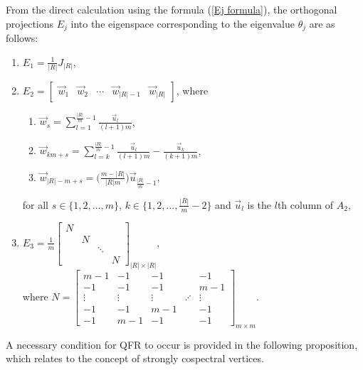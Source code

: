 \documentclass[12pt]{amsart}
\numberwithin{equation}{section}
\theoremstyle{definition}
\theoremstyle{definition} \numberwithin{equation}{section}
\begin{document}
From the direct calculation using the formula (\ref{Ej formula}), the orthogonal projections $E_j$ into the eigenspace corresponding to the eigenvalue $\theta_j$ are as follows: 
\begin{enumerate}
     \item $E_1 = \frac{1}{|R|}J_{|R|}$,
     
        \item $E_2 = \begin{bmatrix}
            \Vec{w}_1 & \Vec{w}_2&\cdots &\Vec{w}_{|R|-1} &\Vec{w}_{|R
            |}
        \end{bmatrix}$, where
            \begin{enumerate} 
            [label=(\roman*)]
                \item $\Vec{w}_s=\sum_{l=1}^{\frac{|R|}{m}-1}\frac{\Vec{u}_l}{(l+1)m}$,
                \item 
    $\Vec{w}_{km+s}=\sum_{l=k}^{\frac{|R|}{m}-1}\frac{\Vec{u}_l}{(l+1)m}-\frac{\Vec{u}_k}{(k+1)m}$, 
                \item 
                $\Vec{w}_{|R|-m+s} = \bigg( \frac{m-|R|}{|R|m} \bigg)\Vec{u}_{\frac{|R|}{m}-1}$, 
            \end{enumerate}
        
        for all $s \in \{1,2,\ldots,m\}$, $k \in \{1,2, \ldots , \frac{|R|}{m}-2\}$ and $\Vec{u}_l$ is the $l$th column of $A_2$,
        \item $E_3=\frac{1}{m} \begin{bmatrix}
            N & & &\\
              & N& &\\
              & &\ddots&\\
              & & &N 
        \end{bmatrix}_{|R| \times |R|}$, \\
        where $N = \begin{bmatrix}
            m-1&-1&-1&&-1\\
            -1&-1&-1&&m-1\\
    \vdots&\vdots&\vdots& \iddots &\vdots\\
             -1&-1&m-1&&-1\\
            -1&m-1&-1&&-1
        \end{bmatrix}_{m\times m}$.
\end{enumerate}

\medskip
A necessary condition for QFR to occur is provided in the following proposition, which relates to the concept of strongly cospectral vertices. 
\end{document}
